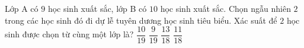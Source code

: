 \begin{ex}%
	Lớp A có $9$ học sinh xuất sắc, lớp B có $10$ học sinh xuất sắc. Chọn ngẫu nhiên $2$ trong các học sinh
	đó đi dự lễ tuyên dương học sinh tiêu biểu. Xác suất để $2$ học sinh được chọn từ cùng một lớp là?
	\choice
	{$\dfrac{10}{19}$}
	{\True $\dfrac{9}{19}$}
	{$\dfrac{13}{18}$}
	{$\dfrac{11}{18}$}
\end{ex}

